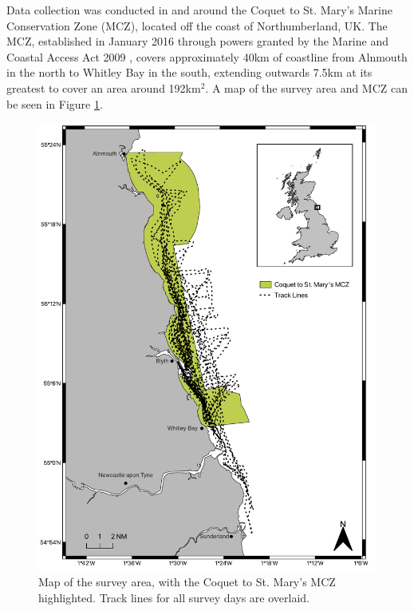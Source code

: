 Data collection was conducted in and around the Coquet to St. Mary's Marine Conservation Zone (MCZ), located off the coast of Northumberland, UK. The MCZ, established in January 2016 through powers granted by the Marine and Coastal Access Act 2009 \cite{noauthor_marine_2009}, covers approximately 40km of coastline from Alnmouth in the north to Whitley Bay in the south, extending outwards 7.5km at its greatest to cover an area around 192km$^{2}$. A map of the survey area and MCZ can be seen in Figure \ref{fig:survey-map}.

 \begin{figure}
	\begin{center}
		\includegraphics[scale=0.7]{Chapter3/figs/survey_map.pdf}
	\end{center}
	\caption[Map of the survey area, with the Coquet to St. Mary's MCZ highlighted.]{Map of the survey area, with the Coquet to St. Mary's MCZ highlighted. Track lines for all survey days are overlaid.}
	\label{fig:survey-map}
\end{figure}

